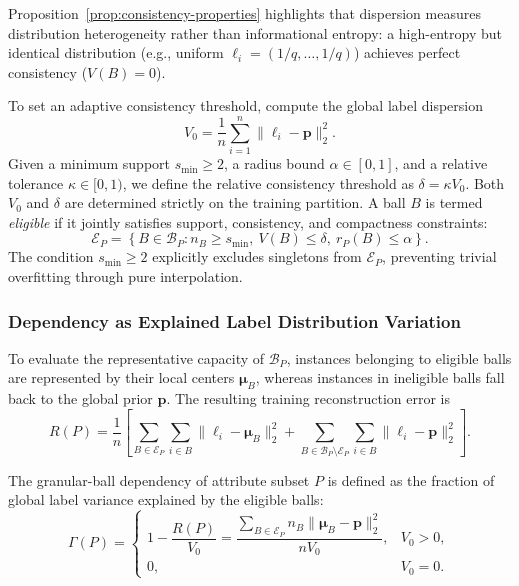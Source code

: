 Proposition~\ref{prop:consistency-properties} highlights that dispersion measures distribution heterogeneity rather than informational entropy: a high-entropy but identical distribution (e.g., uniform $\boldsymbol{\ell}_i = (1/q, \dots, 1/q)$) achieves perfect consistency ($V(B) = 0$).

To set an adaptive consistency threshold, compute the global label dispersion
\begin{equation}
	V_0 = \frac{1}{n}\sum_{i=1}^n \|\boldsymbol{\ell}_i - \boldsymbol{p}\|_2^2.
	\label{eq:global-dispersion}
\end{equation}
Given a minimum support $s_{\min} \ge 2$, a radius bound $\alpha \in [0, 1]$, and a relative tolerance $\kappa \in [0, 1)$, we define the relative consistency threshold as $\delta = \kappa V_0$. Both $V_0$ and $\delta$ are determined strictly on the training partition. A ball $B$ is termed \emph{eligible} if it jointly satisfies support, consistency, and compactness constraints:
\begin{equation}
	\mathcal{E}_P = \left\{ B \in \mathcal{B}_P : n_B \ge s_{\min}, \ V(B) \le \delta, \ r_P(B) \le \alpha \right\}.
	\label{eq:eligible-balls}
\end{equation}
The condition $s_{\min} \ge 2$ explicitly excludes singletons from $\mathcal{E}_P$, preventing trivial overfitting through pure interpolation.

\subsubsection{Dependency as Explained Label Distribution Variation}
To evaluate the representative capacity of $\mathcal{B}_P$, instances belonging to eligible balls are represented by their local centers $\boldsymbol{\mu}_B$, whereas instances in ineligible balls fall back to the global prior $\boldsymbol{p}$. The resulting training reconstruction error is
\begin{equation}
	R(P) = \frac{1}{n} \left[
	\sum_{B \in \mathcal{E}_P} \sum_{i \in B} \|\boldsymbol{\ell}_i - \boldsymbol{\mu}_B\|_2^2 +
	\sum_{B \in \mathcal{B}_P \setminus \mathcal{E}_P} \sum_{i \in B} \|\boldsymbol{\ell}_i - \boldsymbol{p}\|_2^2
	\right].
\end{equation}

\begin{definition}
	\label{def:ldl-dependency}
	The granular-ball dependency of attribute subset $P$ is defined as the fraction of global label variance explained by the eligible balls:
	\begin{equation}
		\Gamma(P) =
		\begin{cases}
			1 - \dfrac{R(P)}{V_0} = \dfrac{\sum_{B \in \mathcal{E}_P} n_B \|\boldsymbol{\mu}_B - \boldsymbol{p}\|_2^2}{n V_0}, & V_0 > 0, \\[8pt]
			0, & V_0 = 0.
		\end{cases}
		\label{eq:ldl-explained-dependency}
	\end{equation}
\end{definition}

